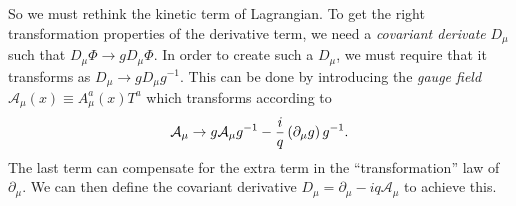 \documentclass[../main.tex]{subfiles}
\begin{document}
So we must rethink the kinetic term of Lagrangian.
To get the right transformation properties of the derivative term, we need a
\emph{covariant derivate } \(D_\mu\) such that \(D_\mu \Phi \to g D_\mu
\Phi\).
In order to create such a \(D_\mu\), we must require that it transforms as
\(D_\mu \to g D_\mu g^{-1}\).
This can be done by introducing the \emph{gauge field} \(\mathcal{A}_\mu(x)
\equiv A_\mu^a(x) T^a\) which transforms according to
\begin{equation}
  \mathcal{A}_\mu \to g \mathcal{A}_\mu g^{-1} - \frac{i}{q}
  \left(\partial_\mu g\right) g^{-1}.
\end{equation}
The last term can compensate for the extra term in the ``transformation'' law
of \(\partial_\mu\).
We can then define the covariant derivative \(D_\mu = \partial_\mu - iq
\mathcal{A}_\mu\) to achieve this.
\medskip
\end{document}
